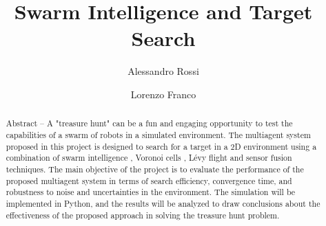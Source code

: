 \documentclass[times, twoside]{zHenriquesLab-StyleBioRxiv}
\begin{document}
\title{Swarm Intelligence and Target Search}

\author[1]{Alessandro Rossi}
\author[1]{Lorenzo Franco}


\maketitle

\begin{abstract}
Abstract -- A "treasure hunt" can be a fun and engaging opportunity to test the capabilities of a swarm of robots in a simulated environment.
The multiagent system proposed in this project is designed to search for a target in a 2D environment using a combination of swarm
intelligence \cite{consensusUSATO,consensus_A_SCHEME}, Voronoi cells \cite{fontanelli,raycast, Loyd_usato}, Lévy flight \cite{levyUSED,levyDISTRIB} and sensor fusion techniques. The main objective of the project is to
evaluate the performance of the proposed multiagent system in terms of search efficiency, convergence time, and robustness to
noise and uncertainties in the environment. The simulation will be implemented in Python, and the results will be analyzed to draw
conclusions about the effectiveness of the proposed approach in solving the treasure hunt problem.
\end {abstract}


\end{document}
